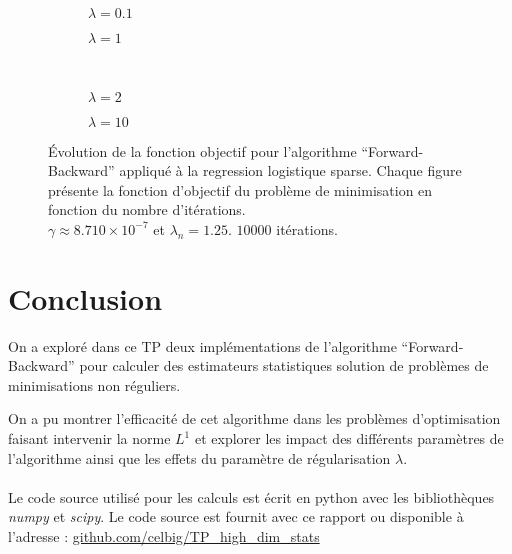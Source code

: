 \documentclass{article}
\begin{document}
\begin{figure}[h!b]
  \centering
     \begin{subfigure}[b]{0.4\textwidth}
         \centering
         
         \caption{$\lambda = 0.1$}
     \end{subfigure}
     \hfill
     \begin{subfigure}[b]{0.4\textwidth}
         \centering
         
         \caption{$\lambda = 1$}
     \end{subfigure}\\
     \begin{subfigure}[b]{0.4\textwidth}
         \centering
         
         \caption{$\lambda = 2$}
         \label{fig:ex2 objectif lambda 2}
     \end{subfigure}
     \hfill
     \begin{subfigure}[b]{0.4\textwidth}
         \centering
         
         \caption{$\lambda = 10$}
     \end{subfigure}
     \caption{Évolution de la fonction objectif pour l'algorithme ``Forward-Backward'' appliqué à la regression logistique sparse. Chaque figure présente la fonction d'objectif du problème de minimisation en fonction du nombre d'itérations. \\
     $\gamma \approx 8.710\times 10^{-7}$ et $\lambda_n = 1.25$. $10000$ itérations.}
     \label{fig:ex2 objective}
\end{figure}

\section*{Conclusion}
On a exploré dans ce TP deux implémentations de l'algorithme ``Forward-Backward'' pour calculer des estimateurs statistiques solution de problèmes de minimisations non réguliers.

On a pu montrer l'efficacité de cet algorithme dans les problèmes d'optimisation faisant intervenir la norme $L^1$ et explorer les impact des différents paramètres de l'algorithme ainsi que les effets du paramètre de régularisation $\lambda$.

\paragraph{}Le code source utilisé pour les calculs est écrit en python avec les bibliothèques \textit{numpy} et \textit{scipy}. Le code source est fournit avec ce rapport ou disponible à l'adresse :  \url{github.com/celbig/TP_high_dim_stats}
\end{document}
